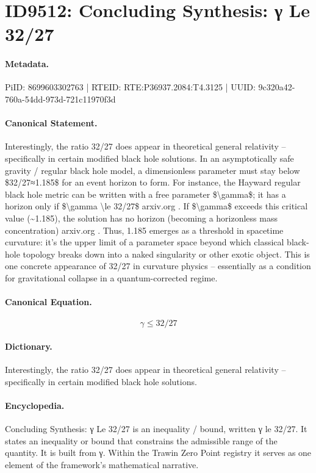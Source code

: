 \section*{ID9512: Concluding Synthesis: γ Le 32/27}
\paragraph{Metadata.}
PiID: 8699603302763 | RTEID: RTE:P36937.2084:T4.3125 | UUID: 9c320a42-760a-54dd-973d-721c11970f3d

\paragraph{Canonical Statement.}
Interestingly, the ratio 32/27 does appear in theoretical general relativity – specifically in certain modified black hole solutions. In an asymptotically safe gravity / regular black hole model, a dimensionless parameter must stay below \$32/27≈1.185\$ for an event horizon to form. For instance, the Hayward regular black hole metric can be written with a free parameter \$\textbackslash{}gamma\$; it has a horizon only if \$\textbackslash{}gamma \textbackslash{}le 32/27\$ arxiv.org . If \$\textbackslash{}gamma\$ exceeds this critical value (\textasciitilde{}1.185), the solution has no horizon (becoming a horizonless mass concentration) arxiv.org . Thus, 1.185 emerges as a threshold in spacetime curvature: it’s the upper limit of a parameter space beyond which classical black-hole topology breaks down into a naked singularity or other exotic object. This is one concrete appearance of 32/27 in curvature physics – essentially as a condition for gravitational collapse in a quantum-corrected regime.

\paragraph{Canonical Equation.}
\[
\gamma \le 32/27
\]

\paragraph{Dictionary.}
Interestingly, the ratio 32/27 does appear in theoretical general relativity – specifically in certain modified black hole solutions.

\paragraph{Encyclopedia.}
Concluding Synthesis: γ Le 32/27 is an inequality / bound, written γ le 32/27. It states an inequality or bound that constrains the admissible range of the quantity. It is built from γ. Within the Trawin Zero Point registry it serves as one element of the framework's mathematical narrative.
